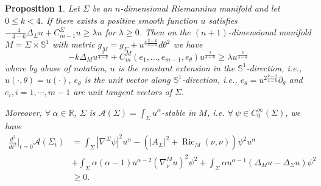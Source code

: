 \documentclass[10pt,a4paper]{amsart}
\newtheorem{proposition}{Proposition}
\DeclareMathOperator{\Ric}{Ric}
\newcommand{\mA}{\mathcal{A}}
\begin{document}
\begin{proposition}\label{lift C_m-1 to C_m}
Let $\Sigma$ be an $n$-dimensional Riemannina manifold and let $0\leq k <4$. If there exists a positive smooth function $u$ satisfies $-\frac{4}{4-k}\Delta_{\Sigma}u+C_{m-1}^{\Sigma}u\geq \lambda u$ for $\lambda\geq 0$. Then on the $(n+1)$-dimensional manifold $M=\Sigma\times \mathbb{S}^{1}$ with metric $g_{M}=g_{\Sigma}+u^{4\frac{2-k}{4-k}}d \theta^2$ we have 
\[
-k\Delta_{M}u^{\frac{2}{4-k}}+C_{m}^{M}(e_{1},...,e_{m-1},e_{\theta})u^{\frac{2}{4-k}} \geq \lambda u^{\frac{2}{4-k}}
\]
where by abuse of notation, $u$ is the constant extension  in the $\mathbb{S}^1$-direction, i.e., $u(\cdot,\theta)=u(\cdot)$, $e_\theta$ is the unit vector along  $\mathbb{S}^1$-direction, i.e., $e_\theta=u^{2\frac{k-2}{4-k}}\partial_\theta$ and $e_i, i=1,\cdots,m-1$ are unit tangent vectors of $\Sigma.$

Moreover, $\forall\ \alpha\in \mathbb{R}$, $\Sigma$ is $\mathcal{A}(\Sigma)=\int_{\Sigma}u^{\alpha}$-stable in $M$, i.e. $\forall\ \psi \in C_{0}^{\infty}(\Sigma)$, we have
\begin{equation*}
        \begin{split}
            \frac{d^2}{d t^2}\bigg|_{t=0}\mA(\Sigma_{t})&=\int_{\Sigma}|\nabla^{\Sigma}\psi|^2 u^{\alpha}-\left(|A_{\Sigma}|^2+\Ric_M(\nu,\nu)\right)\psi^2 u^{\alpha}\\
            &+\int_\Sigma \alpha(\alpha-1)u^{\alpha-2}\left(\nabla^M_{\nu}u\right)^2\psi^2 +\int_{\Sigma}\alpha u^{\alpha-1}\left(\Delta_M u-\Delta_{\Sigma} u\right)\psi^2\\
            &\geq 0.
        \end{split}
    \end{equation*}
\end{proposition}
\end{document}
